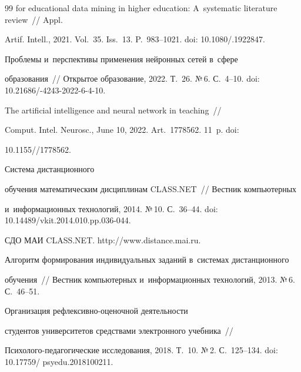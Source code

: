 {{\begin{thebibliography}{99}
for educational data mining in higher education: A~systematic literature review~/\!\!/ Appl. 


Artif. Intell., 2021. Vol.~35. Iss.~13. P.~983--1021. doi: 10.1080\!/.1922847.







 Проблемы и~перспективы применения нейронных сетей в~сфере 


образования~/\!\!/ Открытое образование, 2022. Т.~26. №\,6. С.~4--10. doi: 10.21686\!/-4243-2022-6-4-10.







 The artificial intelligence and neural network in teaching~/\!\!/ 


Comput. Intel. Neurosc., June 10, 2022. Art.~1778562. 11~p. doi: 


10.1155\!//1778562.







 Сис\-те\-ма дистанционного 


обучения математическим дисциплинам CLASS.NET~/\!\!/ Вестник компьютерных 


и~информационных технологий, 2014. №\,10. С.~36--44.  doi: 10.14489\!/\!vkit.2014.010.pp.036-044.




СДО МАИ CLASS.NET. {\sf http://www.distance.mai.ru}.




 Алгоритм формирования индивидуальных заданий в~сис\-те\-мах дистанционного


 обуче\-ния~/\!\!/ Вестник компьютерных и~информационных технологий, 2013. №\,6. С.~46--51.




 Организация рефлексивно-оценочной деятельности 


студентов университетов средствами электронного учебника~/\!\!/  


Пси\-хо\-ло\-го-пе\-да\-го\-ги\-че\-ские исследования, 2018. Т.~10. №\,2. С.~125--134. doi: 10.17759\!/ psyedu.2018100211.


\end{thebibliography}


} }











